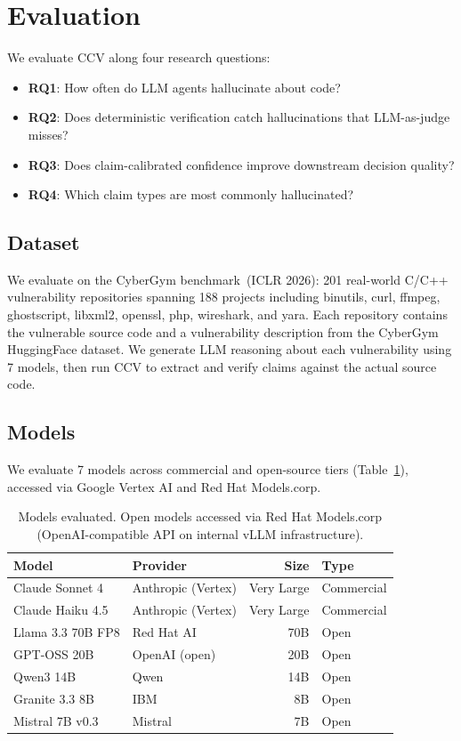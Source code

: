 \section{Evaluation}
\label{sec:evaluation}

We evaluate CCV along four research questions:

\begin{itemize}
    \item \textbf{RQ1}: How often do LLM agents hallucinate about code?
    \item \textbf{RQ2}: Does deterministic verification catch hallucinations that LLM-as-judge misses?
    \item \textbf{RQ3}: Does claim-calibrated confidence improve downstream decision quality?
    \item \textbf{RQ4}: Which claim types are most commonly hallucinated?
\end{itemize}

\subsection{Dataset}

We evaluate on the CyberGym benchmark~(ICLR 2026): 201 real-world C/C++ vulnerability repositories spanning 188 projects including binutils, curl, ffmpeg, ghostscript, libxml2, openssl, php, wireshark, and yara. Each repository contains the vulnerable source code and a vulnerability description from the CyberGym HuggingFace dataset. We generate LLM reasoning about each vulnerability using 7 models, then run CCV to extract and verify claims against the actual source code.

\subsection{Models}

We evaluate 7 models across commercial and open-source tiers (Table~\ref{tab:models}), accessed via Google Vertex AI and Red Hat Models.corp.

\begin{table}[t]
\centering
\caption{Models evaluated. Open models accessed via Red Hat Models.corp (OpenAI-compatible API on internal vLLM infrastructure).}
\label{tab:models}
\small
\begin{tabular}{llrl}
\toprule
\textbf{Model} & \textbf{Provider} & \textbf{Size} & \textbf{Type} \\
\midrule
Claude Sonnet 4 & Anthropic (Vertex) & Very Large & Commercial \\
Claude Haiku 4.5 & Anthropic (Vertex) & Very Large & Commercial \\
Llama 3.3 70B FP8 & Red Hat AI & 70B & Open \\
GPT-OSS 20B & OpenAI (open) & 20B & Open \\
Qwen3 14B & Qwen & 14B & Open \\
Granite 3.3 8B & IBM & 8B & Open \\
Mistral 7B v0.3 & Mistral & 7B & Open \\
\bottomrule
\end{tabular}
\end{table}

